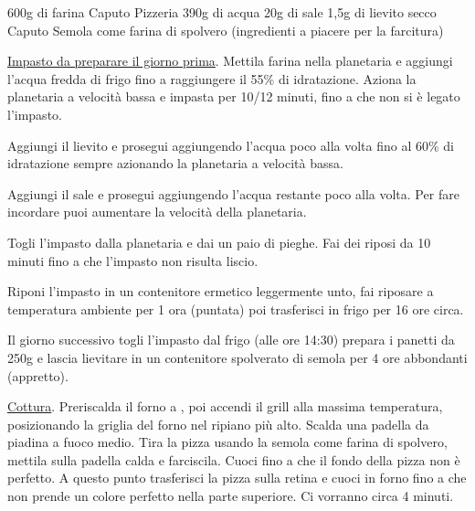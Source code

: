 \begin{ingreds}
	600g di farina Caputo Pizzeria
	390g di acqua
	20g di sale
	1,5g di lievito secco Caputo
	Semola come farina di spolvero
	(ingredienti a piacere per la farcitura)


\end{ingreds}

\begin{method}
\underline{Impasto da preparare il giorno prima}. Mettila farina nella planetaria e aggiungi l'acqua fredda di frigo fino a raggiungere il 55\% di idratazione. Aziona la planetaria a velocità bassa e impasta per 10/12 minuti, fino a che non si è legato l'impasto.

Aggiungi il lievito e prosegui aggiungendo l'acqua poco alla volta fino al 60\% di idratazione sempre azionando la planetaria a velocità bassa.

Aggiungi il sale e prosegui aggiungendo l'acqua restante poco alla volta. Per fare incordare puoi aumentare la velocità della planetaria.

Togli l'impasto dalla planetaria e dai un paio di pieghe. Fai dei riposi da 10 minuti fino a che l'impasto non risulta liscio.

Riponi l'impasto in un contenitore ermetico leggermente unto, fai riposare a temperatura ambiente per 1 ora (puntata) poi trasferisci in frigo per 16 ore circa.

Il giorno successivo togli l'impasto dal frigo (alle ore 14:30) prepara i panetti da 250g e lascia lievitare in un contenitore spolverato di semola per 4 ore abbondanti (appretto).

\underline{Cottura}. Preriscalda il forno a , poi accendi il grill alla massima temperatura, posizionando la griglia del forno nel ripiano più alto. Scalda una padella da piadina a fuoco medio. Tira la pizza usando la semola come farina di spolvero, mettila sulla padella calda e farciscila. Cuoci fino a che il fondo della pizza non è perfetto. A questo punto trasferisci la pizza sulla retina e cuoci in forno fino a che non prende un colore perfetto nella parte superiore. Ci vorranno circa 4 minuti.


\end{method}
